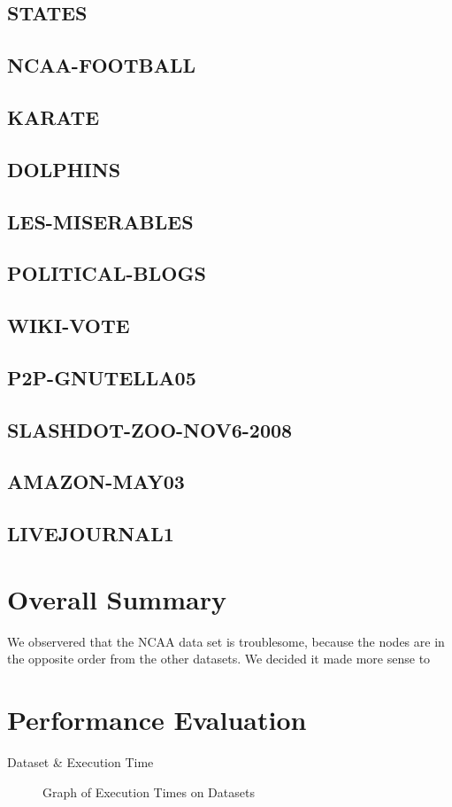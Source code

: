 \documentclass{report}
\begin{document}
\subsection{STATES}
\subsection{NCAA-FOOTBALL}
\subsection{KARATE}
\subsection{DOLPHINS}
\subsection{LES-MISERABLES}
\subsection{POLITICAL-BLOGS}
\subsection{WIKI-VOTE}
\subsection{P2P-GNUTELLA05}
\subsection{SLASHDOT-ZOO-NOV6-2008}
\subsection{AMAZON-MAY03}
\subsection{LIVEJOURNAL1}

\section{Overall Summary}
We observered that the NCAA data set is troublesome, because the nodes are in the opposite order from the other datasets. We decided it made more sense to 

\section{Performance Evaluation}
\begin{table}
  \centering
  \begin{tabular}{}
    \toprule
    Dataset & Execution Time\\
    \midrule
    \bottomrule
  \end{tabular}
  \caption{Execution Times on Datasets}
  \label{execution-times-table}
\end{table}
\begin{figure}
  \centering
  
  \caption{Graph of Execution Times on Datasets}
  \label{execution-times-graph}
\end{figure}
\appendix
\end{document}
